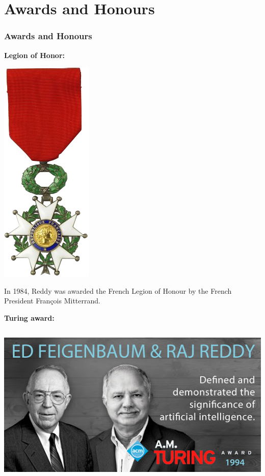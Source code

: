 \documentclass{beamer}
\begin{document}
 \section{Awards and Honours}
\begin{frame}[allowframebreaks]
 \frametitle{Awards and Honours}
 
  {\bf Legion of Honor:}
    \begin{center}
     \includegraphics[scale=0.35]{rajloh.png}
    \end{center}
    
    In 1984, Reddy was awarded the French Legion of Honour 
    by the French President Fran\c{c}ois Mitterrand.        
     \framebreak
              
    {\bf Turing award:} 
    \begin{columns}
     \begin{column}{0.45\textwidth}
      \includegraphics[scale=0.2615]{rajco.jpg}
     \end{column}
     

\end{columns}
\end{frame}
\end{document}
